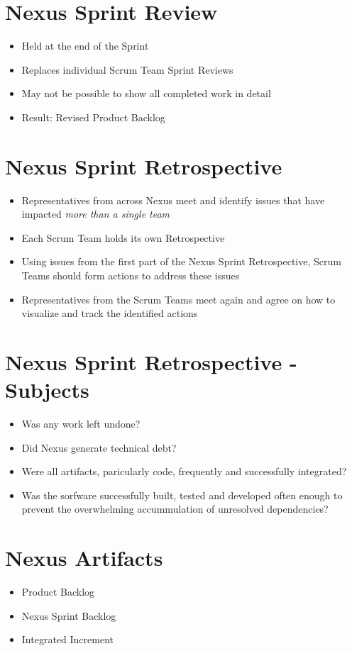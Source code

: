 \documentclass[a4paper,11pt,twocolumn]{article}
\begin{document}
\section*{Nexus Sprint Review}
\begin{itemize}
	\item Held at the end of the Sprint
	\item Replaces individual Scrum Team Sprint Reviews
	\item May not be possible to show all completed work in detail
	\item Result: Revised Product Backlog
\end{itemize}

\section*{Nexus Sprint Retrospective}
\begin{itemize}
	\item Representatives from across Nexus meet and identify issues that have impacted \textit{more than a single team}
	\item Each Scrum Team holds its own Retrospective
	\item Using issues from the first part of the Nexus Sprint Retrospective, Scrum Teams should form actions to address these issues
	\item Representatives from the Scrum Teams meet again and agree on how to visualize and track the identified actions
\end{itemize}

\section*{Nexus Sprint Retrospective - Subjects}
\begin{itemize}
	\item Was any work left undone?
	\item Did Nexus generate technical debt?
	\item Were all artifacts, paricularly code, frequently and successfully integrated?
	\item Was the sorfware successfully built, tested and developed often enough to prevent the overwhelming accummulation of unresolved dependencies?
\end{itemize}

\section*{Nexus Artifacts}
\begin{itemize}
	\item Product Backlog
	\item Nexus Sprint Backlog
	\item Integrated Increment
\end{itemize}
\end{document}
